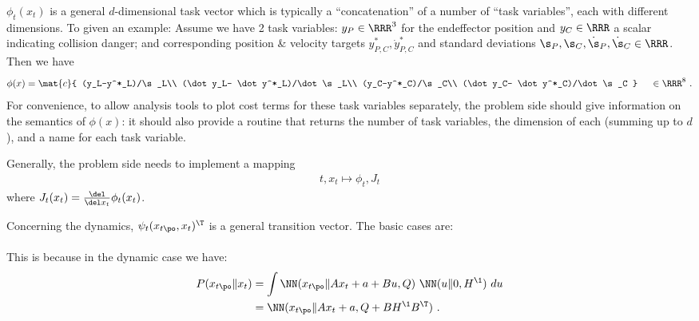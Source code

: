 $\phi_t(x_t)$ is a general $d$-dimensional task vector which is
typically a ``concatenation'' of a number of ``task variables'', each
with different dimensions. To given an example: Assume we have 2 task
variables: $y_P\in\RRR^3$ for the endeffector position and
$y_C\in\RRR$ a scalar indicating collision danger; and corresponding
position \& velocity targets $y^*_{P,C},\dot y^*_{P,C}$ and standard
deviations $\s_P,\s_C,\dot\s_P,\dot\s_C\in\RRR$. Then we have
\begin{align}
\phi(x) = 
\mat{c}{
(y_L-y^*_L)/\s_L\\
(\dot y_L- \dot y^*_L)/\dot \s_L\\
(y_C-y^*_C)/\s_C\\
(\dot y_C- \dot y^*_C)/\dot \s_C
} ~\quad\in\RRR^8~.
\end{align}
For convenience, to allow analysis tools to plot cost terms for these
task variables separately, the problem side should give information on
the semantics of $\phi(x)$: it should also provide a routine that
returns the number of task variables, the dimension of each (summing
up to $d$), and a name for each task variable.

Generally, the problem side needs to implement a mapping
\begin{align}
t, x_t \mapsto \phi_t, J_t
\end{align}
where $J_t(x_t) = \frac{\del}{\del x_t}\phi_t(x_t)$.

Concerning the dynamics, $\psi_t(x_{t\po},x_t)^\T$ is a general
transition vector. The basic cases are:\\
\\
This is because in the dynamic case we have:
\begin{align}
P(x_{t\po} \| x_t)
 &= \int \NN(x_{t\po} \| A x_t + a + B u , Q)~ \NN(u \| 0, H^\1)~ du\\
 &= \NN(x_{t\po} \| A x_t + a, Q  + B H^\1 B^\T) ~.
\end{align}

